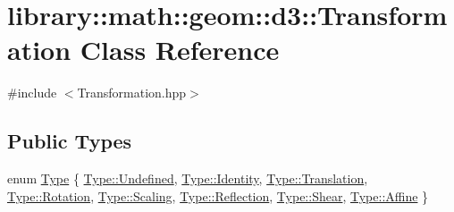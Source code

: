 \hypertarget{classlibrary_1_1math_1_1geom_1_1d3_1_1_transformation}{}\section{library\+:\+:math\+:\+:geom\+:\+:d3\+:\+:Transformation Class Reference}
\label{classlibrary_1_1math_1_1geom_1_1d3_1_1_transformation}


{\ttfamily \#include $<$Transformation.\+hpp$>$}

\subsection*{Public Types}
\begin{DoxyCompactItemize}
\item 
enum \hyperlink{classlibrary_1_1math_1_1geom_1_1d3_1_1_transformation_a25f1dc99d391174bf82a7132d08b2fc1}{Type} \{ \newline
\hyperlink{classlibrary_1_1math_1_1geom_1_1d3_1_1_transformation_a25f1dc99d391174bf82a7132d08b2fc1aec0fc0100c4fc1ce4eea230c3dc10360}{Type\+::\+Undefined}, 
\hyperlink{classlibrary_1_1math_1_1geom_1_1d3_1_1_transformation_a25f1dc99d391174bf82a7132d08b2fc1ac9c5c65fb4af9cf90eb99b3b84424189}{Type\+::\+Identity}, 
\hyperlink{classlibrary_1_1math_1_1geom_1_1d3_1_1_transformation_a25f1dc99d391174bf82a7132d08b2fc1a6dd08874f83507e9c7b23f1a46b7fa7c}{Type\+::\+Translation}, 
\hyperlink{classlibrary_1_1math_1_1geom_1_1d3_1_1_transformation_a25f1dc99d391174bf82a7132d08b2fc1af1a42bd417390fc63b030a519624607a}{Type\+::\+Rotation}, 
\newline
\hyperlink{classlibrary_1_1math_1_1geom_1_1d3_1_1_transformation_a25f1dc99d391174bf82a7132d08b2fc1abc967dc2d57e6eff184a821bf7577a80}{Type\+::\+Scaling}, 
\hyperlink{classlibrary_1_1math_1_1geom_1_1d3_1_1_transformation_a25f1dc99d391174bf82a7132d08b2fc1aaea1e492943ccbad7ee270ec1e064758}{Type\+::\+Reflection}, 
\hyperlink{classlibrary_1_1math_1_1geom_1_1d3_1_1_transformation_a25f1dc99d391174bf82a7132d08b2fc1a02414922b70cc0f9d7c841b0c70a0f94}{Type\+::\+Shear}, 
\hyperlink{classlibrary_1_1math_1_1geom_1_1d3_1_1_transformation_a25f1dc99d391174bf82a7132d08b2fc1a5b525aab6e200981a842101f1bcbafc6}{Type\+::\+Affine}
 \}
\end{DoxyCompactItemize}
